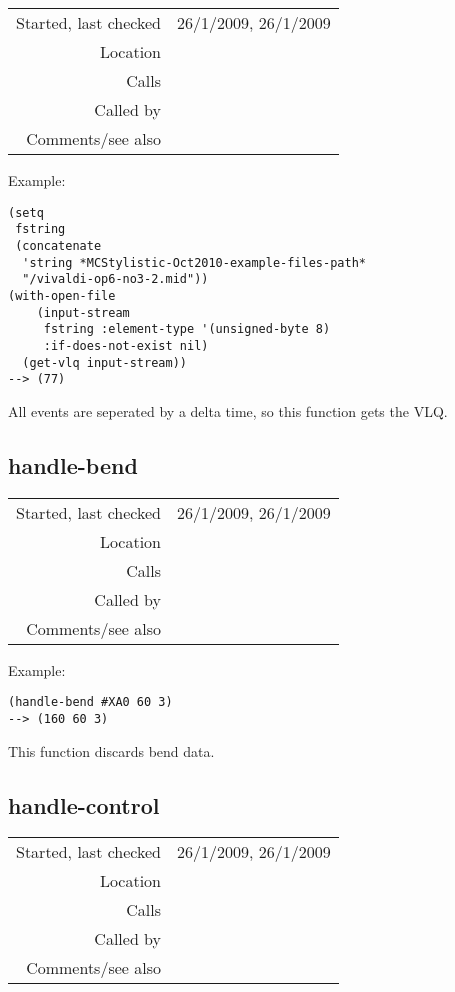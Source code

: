 \vspace{0.3cm}
\begin{tabular}{r|p{8cm}}
Started, last checked & 26/1/2009, 26/1/2009 \\
Location & \nameref{sec:MIDI-import} \\
Calls & \\
Called by & \nameref{fun:set-track-time} \\
Comments/see also & \nameref{fun:convert-vlq}
\end{tabular}

\vspace{0.5cm}
\noindent Example:
\begin{verbatim}
(setq
 fstring
 (concatenate
  'string *MCStylistic-Oct2010-example-files-path*
  "/vivaldi-op6-no3-2.mid"))
(with-open-file
    (input-stream
     fstring :element-type '(unsigned-byte 8)
     :if-does-not-exist nil)
  (get-vlq input-stream))
--> (77)
\end{verbatim}

\noindent All events are seperated by a delta time, so
this function gets the VLQ.


\subsection*{handle-bend}\label{fun:handle-bend}

\vspace{0.3cm}
\begin{tabular}{r|p{8cm}}
Started, last checked & 26/1/2009, 26/1/2009 \\
Location & \nameref{sec:MIDI-import} \\
Calls & \\
Called by & \nameref{fun:parse-events} \\
Comments/see also &
\end{tabular}

\vspace{0.5cm}
\noindent Example:
\begin{verbatim}
(handle-bend #XA0 60 3)
--> (160 60 3)
\end{verbatim}

\noindent This function discards bend data.


\subsection*{handle-control}\label{fun:handle-control}

\vspace{0.3cm}
\begin{tabular}{r|p{8cm}}
Started, last checked & 26/1/2009, 26/1/2009 \\
Location & \nameref{sec:MIDI-import} \\
Calls & \\
Called by & \nameref{fun:parse-events} \\
Comments/see also &
\end{tabular}

